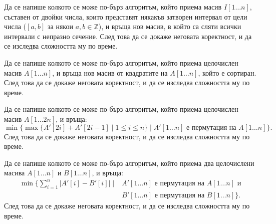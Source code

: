 \begin{problem}
Да се напише колкото се може по-бърз алгоритъм, който приема масив $I[1 \dots n]$, съставен от двойки числа, които представят някакъв затворен интервал от цели числа ($[a, b]$ за някои $a, b \in \mathbb{Z}$), и връща нов масив, в който са сляти всички интервали с непразно сечение.
След това да се докаже неговата коректност, и да се изследва сложността му по време.
\end{problem}

\begin{problem}
Да се напише колкото се може по-бърз алгоритъм, който приема целочислен масив $A[1 \dots n]$, и връща нов масив от квадратите на $A[1 \dots n]$, който е сортиран.
След това да се докаже неговата коректност, и да се изследва сложността му по време.
\end{problem}

\begin{problem}
Да се напише колкото се може по-бърз алгоритъм, който приема целочислен масив $A[1 \dots 2n]$, и връща:
\[
    \min\{ \max \{ A'[2i] + A'[2i - 1] \mid 1 \leq i \leq n \} \mid A'[1 \dots n] \text{ е пермутация на } A[1 \dots n] \}.
\]
След това да се докаже неговата коректност, и да се изследва сложността му по време.
\end{problem}

\begin{problem}
Да се напише колкото се може по-бърз алгоритъм, който приема два целочислени масива $A[1 \dots n]$ и $B[1 \dots n]$, и връща:
\begin{align*}
    \min \{ \sum\limits_{i = 1}^n |A'[i] - B'[i]| \mid & A'[1 \dots n] \text{ е пермутация на } A[1 \dots n] \text{ и} \\
                                                       & B'[1 \dots n] \text{ е пермутация на } B[1 \dots n] \}.
\end{align*}
След това да се докаже неговата коректност, и да се изследва сложността му по време.
\end{problem}

